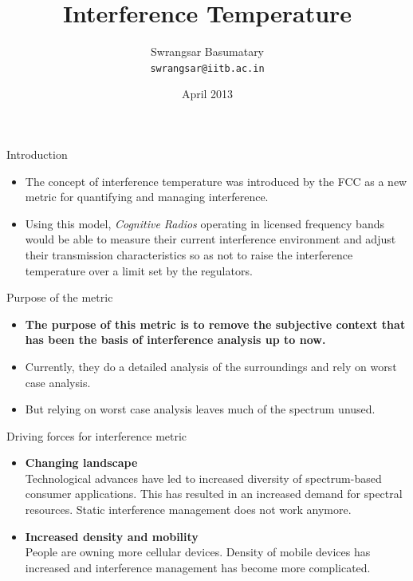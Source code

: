 \documentclass[mathserif]{beamer}
\title{Interference Temperature}
\author{Swrangsar Basumatary \\
\texttt{swrangsar@iitb.ac.in}}
\institute{Department of Electrical Engineering \\ Indian Institute of Technology Bombay}
\date{April 2013}
\begin{document}
\frame{\titlepage}



\begin{frame}{Introduction}

\begin{itemize}
	\pause
	\item The concept of interference temperature was introduced by the FCC as a new metric for quantifying and managing interference.
	\pause
	\item Using this model, \emph{Cognitive Radios} operating in licensed frequency bands would be able to measure their current interference environment and adjust their transmission characteristics so as not to raise the interference temperature over a limit set by the regulators.
\end{itemize}

\end{frame}



\begin{frame}{Purpose of the metric}

\begin{itemize}
	\pause 
	\item \textbf{The purpose of this metric is to remove the subjective context that has been the basis of interference analysis up to now.}
	\pause
	\item Currently, they do a  detailed analysis of the surroundings and rely on worst case analysis.
	
	
	\item But relying on worst case analysis leaves much of the spectrum unused. 
\end{itemize}

\end{frame}



\begin{frame}{Driving forces for interference metric}

\begin{itemize}
\pause
\item \textbf{Changing landscape} \\

Technological advances have led to increased diversity of spectrum-based consumer applications. This has resulted in an increased demand for spectral resources. Static interference management does not work anymore.

\pause
\item \textbf{Increased density and mobility} \\

People are owning more cellular devices. Density of mobile devices has increased and interference management has become more complicated.

\end{itemize}

\end{frame}
\end{document}
